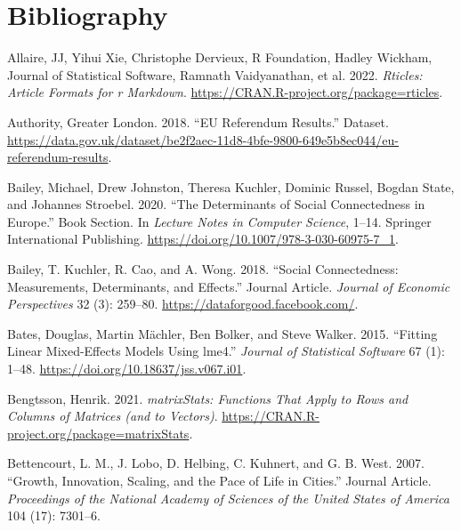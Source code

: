 \documentclass{article}
\newlength{\cslhangindent}
\newlength{\cslentryspacingunit} %
\newenvironment{CSLReferences}[2] %
 {%
  \setlength{\parindent}{0pt}
  \ifodd #1
  \let\oldpar\par
  \def\par{\hangindent=\cslhangindent\oldpar}
  \fi
  \setlength{\parskip}{#2\cslentryspacingunit}
 }%
 {}
\begin{document}
\hypertarget{bibliography}{%
\section*{Bibliography}\label{bibliography}}

\hypertarget{refs}{}
\begin{CSLReferences}{1}{0}
\leavevmode{}%
Allaire, JJ, Yihui Xie, Christophe Dervieux, R Foundation, Hadley
Wickham, Journal of Statistical Software, Ramnath Vaidyanathan, et al.
2022. \emph{Rticles: Article Formats for r Markdown}.
\url{https://CRAN.R-project.org/package=rticles}.

\leavevmode{}%
Authority, Greater London. 2018. {``EU Referendum Results.''} Dataset.
\url{https://data.gov.uk/dataset/be2f2aec-11d8-4bfe-9800-649e5b8ec044/eu-referendum-results}.

\leavevmode{}%
Bailey, Michael, Drew Johnston, Theresa Kuchler, Dominic Russel, Bogdan
State, and Johannes Stroebel. 2020. {``The Determinants of Social
Connectedness in Europe.''} Book Section. In \emph{Lecture Notes in
Computer Science}, 1--14. Springer International Publishing.
\url{https://doi.org/10.1007/978-3-030-60975-7_1}.

\leavevmode{}%
Bailey, T. Kuchler, R. Cao, and A. Wong. 2018. {``Social Connectedness:
Measurements, Determinants, and Effects.''} Journal Article.
\emph{Journal of Economic Perspectives} 32 (3): 259--80.
\url{https://dataforgood.facebook.com/}.

\leavevmode{}%
Bates, Douglas, Martin Mächler, Ben Bolker, and Steve Walker. 2015.
{``Fitting Linear Mixed-Effects Models Using {lme4}.''} \emph{Journal of
Statistical Software} 67 (1): 1--48.
\url{https://doi.org/10.18637/jss.v067.i01}.

\leavevmode{}%
Bengtsson, Henrik. 2021. \emph{matrixStats: Functions That Apply to Rows
and Columns of Matrices (and to Vectors)}.
\url{https://CRAN.R-project.org/package=matrixStats}.

\leavevmode{}%
Bettencourt, L. M., J. Lobo, D. Helbing, C. Kuhnert, and G. B. West.
2007. {``Growth, Innovation, Scaling, and the Pace of Life in Cities.''}
Journal Article. \emph{Proceedings of the National Academy of Sciences
of the United States of America} 104 (17): 7301--6.


\end{CSLReferences}
\end{document}
